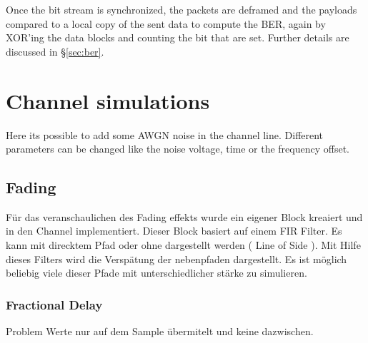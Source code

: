 Once the bit stream is synchronized, the packets are deframed and the payloads compared to a local copy of the sent data to compute the BER, again by XOR'ing the data blocks and counting the bit that are set. Further details are discussed in \S\ref{sec:ber}.

\section{Channel simulations}

Here its possible to add some AWGN noise in the channel line. Different parameters can be changed like the noise voltage, time or the frequency offset.


%
%

\subsection{Fading}
Für das veranschaulichen des Fading effekts wurde ein eigener Block kreaiert und in den Channel implementiert. Dieser Block basiert auf einem FIR Filter. Es kann mit direcktem Pfad oder ohne dargestellt werden ( Line of Side ). Mit Hilfe dieses Filters wird die Verspätung der nebenpfaden dargestellt. Es ist möglich beliebig viele dieser Pfade mit unterschiedlicher stärke zu simulieren.

\subsubsection{Fractional Delay}
Problem Werte nur auf dem Sample übermitelt und keine dazwischen.




